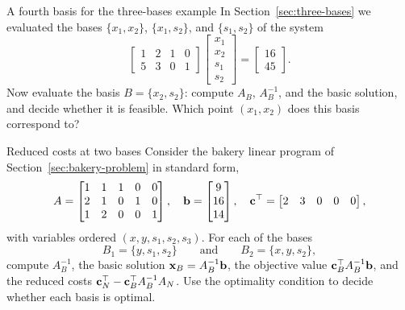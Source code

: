 \begin{ex}{A fourth basis for the three-bases example}{}
\label{ex:matrix-fourth-basis}
 In Section~\ref{sec:three-bases} we evaluated the bases \( \{x_1, x_2\} \), \( \{x_1, s_2\} \), and \( \{s_1, s_2\} \) of the system
\[
\begin{bmatrix}
    1 & 2 & 1 & 0 \\
    5 & 3 & 0 & 1
\end{bmatrix}
\begin{bmatrix}
    x_1 \\ x_2 \\ s_1 \\ s_2
\end{bmatrix}
=
\begin{bmatrix}
    16 \\ 45
\end{bmatrix}.
\]
Now evaluate the basis \( B = \{x_2, s_2\} \): compute \( A_B \), \( A_B^{-1} \), and the basic solution, and decide whether it is feasible.  Which point \( (x_1, x_2) \) does this basis correspond to?
\exrefs{\S\ref{sec:three-bases}}
\end{ex}


\begin{ex}{Reduced costs at two bases}{}
\label{ex:matrix-reduced-costs}
 Consider the bakery linear program of Section~\ref{sec:bakery-problem} in standard form,
\[
A =
\begin{bmatrix}
1 & 1 & 1 & 0 & 0 \\
2 & 1 & 0 & 1 & 0 \\
1 & 2 & 0 & 0 & 1
\end{bmatrix},
\quad
\mathbf{b} = \begin{bmatrix} 9 \\ 16 \\ 14 \end{bmatrix},
\quad
\mathbf{c}^\top = \begin{bmatrix} 2 & 3 & 0 & 0 & 0 \end{bmatrix},
\]
with variables ordered \( (x, y, s_1, s_2, s_3) \).  For each of the bases
\[
B_1 = \{y, s_1, s_2\}
\qquad \text{and} \qquad
B_2 = \{x, y, s_2\},
\]
compute \( A_B^{-1} \), the basic solution \( \mathbf{x}_B = A_B^{-1}\mathbf{b} \), the objective value \( \mathbf{c}_B^\top A_B^{-1} \mathbf{b} \), and the reduced costs \( \mathbf{c}_N^\top - \mathbf{c}_B^\top A_B^{-1} A_N \).  Use the optimality condition to decide whether each basis is optimal.
\exrefs{\S\ref{sec:optimality-conditions}, \S\ref{sec:bakery-problem}}
\end{ex}

